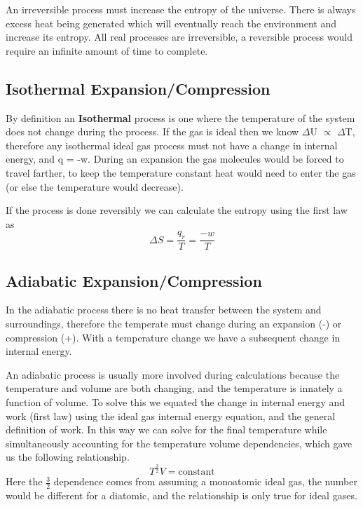 \documentclass{article}
\begin{document}
An irreversible process must increase the entropy of the universe.
There is always excess heat being generated which will eventually reach the environment and increase its entropy. 
All real processes are irreversible, a reversible process would require an infinite amount of time to complete. 
 
 \subsection{Isothermal Expansion/Compression}
 By definition an \textbf{Isothermal} process is one where the temperature of the system does not change during the process. 
 If the gas is ideal then we know $\Delta$U $\propto$ $\Delta$T, therefore any isothermal ideal gas process must not have a change in internal energy, and q = -w. 
 During an expansion the gas molecules would be forced to travel farther, to keep the temperature constant heat would need to enter the gas (or else the temperature would decrease). 
 
 If the process is done reversibly we can calculate the entropy using the first law as 
 \begin{equation}
     \Delta S = \frac{q_r}{T} = \frac{-w}{T}
 \end{equation}

  \subsection{Adiabatic Expansion/Compression}
 In the adiabatic process there is no heat transfer between the system and surroundings, therefore the temperate must change during an expansion (-) or compression (+). 
 With a temperature change we have a subsequent change in internal energy. 
 
 An adiabatic process is usually more involved during calculations because the temperature and volume are both changing, and the temperature is innately a function of volume. 
 To solve this we equated the change in internal energy and work (first law) using the ideal gas internal energy equation, and the general definition of work. 
 In this way we can solve for the final temperature while simultaneously accounting for the temperature volume dependencies, which gave us the following relationship.
 \begin{equation}
     T^{\frac{3}{2}}V = \text{constant}
 \end{equation}
 Here the $\frac{3}{2}$ dependence comes from assuming a monoatomic ideal gas, the number would be different for a diatomic, and the relationship is only true for ideal gases. 
 
\end{document}
